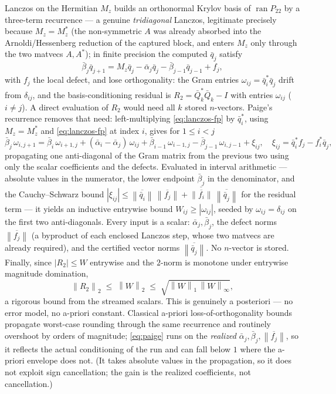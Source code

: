 \documentclass[11pt,a4paper]{article}
\newcommand{\norm}[1]{\left\|#1\right\|}
\newcommand{\abs}[1]{\left|#1\right|}
\theoremstyle{plain}
\theoremstyle{definition}
\begin{document}
Lanczos on the Hermitian $M_z$ builds an orthonormal Krylov basis of
$\operatorname{ran}P_{22}$ by a three-term recurrence --- a genuine \emph{tridiagonal}
Lanczos, legitimate precisely because $M_z=M_z^{*}$ (the non-symmetric $A$ was already
absorbed into the Arnoldi/Hessenberg reduction of the captured block, and enters $M_z$ only
through the two matvecs $A,A^{*}$); in finite precision the computed
$\bar q_j$ satisfy
\begin{equation}\label{eq:lanczos-fp}
  \bar\beta_j\bar q_{j+1}=M_z\bar q_j-\bar\alpha_j\bar q_j-\bar\beta_{j-1}\bar q_{j-1}+f_j,
\end{equation}
with $f_j$ the local defect, and lose orthogonality: the Gram entries
$\omega_{ij}=\bar q_i^{*}\bar q_j$ drift from $\delta_{ij}$, and the basis-conditioning
residual is $R_2=\bar Q_k^{*}\bar Q_k-I$ with entries $\omega_{ij}$ ($i\ne j$). A direct
evaluation of $R_2$ would need all $k$ stored $n$-vectors. Paige's recurrence removes that
need: left-multiplying \eqref{eq:lanczos-fp} by $\bar q_i^{*}$, using $M_z=M_z^{*}$ and
\eqref{eq:lanczos-fp} at index $i$, gives for $1\le i<j$
\begin{equation}\label{eq:paige}
  \bar\beta_j\,\omega_{i,j+1}
  =\bar\beta_i\,\omega_{i+1,j}+(\bar\alpha_i-\bar\alpha_j)\,\omega_{ij}
   +\bar\beta_{i-1}\,\omega_{i-1,j}-\bar\beta_{j-1}\,\omega_{i,j-1}+\xi_{ij},
  \quad \xi_{ij}=\bar q_i^{*}f_j-f_i^{*}\bar q_j,
\end{equation}
propagating one anti-diagonal of the Gram matrix from the previous two using only the
scalar coefficients and the defects. Evaluated in interval arithmetic --- absolute values
in the numerator, the lower endpoint $\underline{\bar\beta_j}$ in the denominator, and the
Cauchy--Schwarz bound
$\abs{\xi_{ij}}\le\overline{\norm{\bar q_i}}\,\overline{\norm{f_j}}+\overline{\norm{f_i}}\,\overline{\norm{\bar q_j}}$
for the residual term --- it yields an inductive entrywise bound $W_{ij}\ge\abs{\omega_{ij}}$,
seeded by $\omega_{ij}=\delta_{ij}$ on the first two anti-diagonals. Every input is a scalar:
$\bar\alpha_j,\bar\beta_j$, the defect norms $\overline{\norm{f_j}}$ (a byproduct of each
enclosed Lanczos step, whose two matvecs are already required), and the certified vector
norms $\overline{\norm{\bar q_j}}$. No $n$-vector is stored. Finally, since $\abs{R_2}\le W$
entrywise and the $2$-norm is monotone under entrywise magnitude domination,
\begin{equation}\label{eq:r2bound}
  \norm{R_2}_2\;\le\;\norm{W}_2\;\le\;\sqrt{\norm{W}_1\,\norm{W}_\infty},
\end{equation}
a rigorous bound from the streamed scalars. This is genuinely a posteriori --- no error
model, no a-priori constant. Classical a-priori loss-of-orthogonality bounds propagate
worst-case rounding through the same recurrence and routinely overshoot by orders of
magnitude; \eqref{eq:paige} runs on the \emph{realized} $\bar\alpha_j,\bar\beta_j,\overline{\norm{f_j}}$,
so it reflects the actual conditioning of the run and can fall below $1$ where the a-priori
envelope does not. (It takes absolute values in the propagation, so it does not exploit
sign cancellation; the gain is the realized coefficients, not cancellation.)
\end{document}
